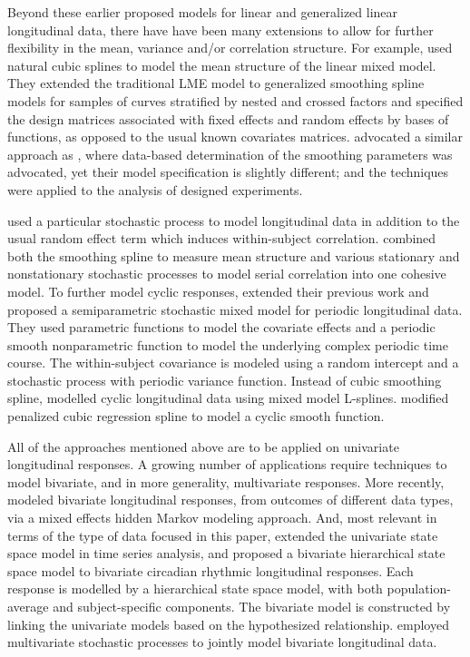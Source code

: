 \documentclass[12pt, notitlepage]{article}
\begin{document}
Beyond these earlier proposed models for linear and generalized linear longitudinal data, there have have been many extensions to allow for further flexibility in the mean, variance and/or correlation structure.  For example, 
\citet{Brumback:1998} used natural cubic splines to model the mean structure of the linear mixed model.  
They extended the traditional LME  model to generalized smoothing spline models for samples of curves stratified by nested and crossed factors and specified the design matrices associated with fixed effects and random effects by bases of functions, as opposed to the usual known covariates matrices.  \citet{Verb:Cull:Kenw:Welh:quan:1999} advocated a similar approach as \citet{Brumback:1998}, where data-based determination of the smoothing parameters was advocated, yet their model specification is slightly different; and the techniques were applied to the analysis of designed experiments. 

\citet*{Tayl:Cumb:Sy:quan:1994} used a particular stochastic process to model longitudinal data in addition to the usual random effect term which  induces within-subject correlation. \cite {Zhang:1998} combined both the smoothing spline to measure mean structure and  various stationary and nonstationary stochastic processes to model serial correlation into one cohesive model. To further model cyclic responses, 
\citet*{Zhan:Lin:Sowe:quan:2000} 
extended their previous work and proposed a  semiparametric stochastic mixed model for periodic longitudinal data. They used parametric functions to model the covariate effects and a periodic smooth nonparametric function to model the underlying complex periodic time course. The within-subject covariance is modeled using a random intercept and a stochastic process with periodic variance function. Instead of cubic smoothing spline, \cite{Welh:Cull:Kenw:Thom:quan:2006} modelled cyclic longitudinal data using mixed model L-splines. 
\citet{Wood:2006} modified penalized cubic regression spline to model a cyclic smooth function. 

All of the approaches mentioned above are to be applied on univariate longitudinal responses. A growing number of applications require techniques to model bivariate, and in more generality, multivariate responses. More recently, \cite{Raffa:2015} modeled bivariate longitudinal responses, from outcomes of different data types, via a mixed effects hidden Markov modeling approach.  And, most relevant in terms of the type of data focused in this paper,  \cite{Liu:Capp:Crof:Guo:quan:2014} extended the univariate state space model in time series analysis, and proposed a bivariate hierarchical state space model to bivariate circadian rhythmic  longitudinal responses. 
Each response is modelled by a hierarchical state space model, with both population-average and subject-specific components. The bivariate model is constructed by linking the univariate models based on the hypothesized relationship. \citet*{Sy:Cumb:Tayl:quan:1997} employed multivariate stochastic processes to jointly model  bivariate longitudinal data. 
\end{document}
